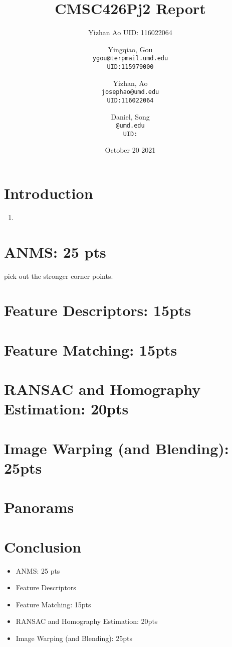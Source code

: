 \documentclass{article}
\title{CMSC426Pj2 Report}
\author{Yizhan Ao UID: 116022064}
\author{
  Yingqiao, Gou\\
  \texttt{ygou@terpmail.umd.edu}\\
  \texttt{UID:115979000}
  \and
  Yizhan, Ao\\
  \texttt{josephao@umd.edu}\\
  \texttt{UID:116022064}
  \and
  Daniel, Song\\
  \texttt{@umd.edu}\\
  \texttt{UID:}
}
\date{October 20 2021}
\begin{document}
\maketitle

\section{Introduction}
\begin{enumerate}
   \item
\end{enumerate}

\section{ANMS: 25 pts}
 pick out the stronger corner points.\\
 
\section{Feature Descriptors: 15pts}

\section{Feature Matching: 15pts}

\section{RANSAC and Homography Estimation: 20pts}
 
 
 
\section{Image Warping (and Blending): 25pts}

\section{Panorams}


\section{Conclusion}




\begin{itemize}

    \item ANMS: 25 pts
    \item Feature Descriptors
    \item Feature Matching: 15pts
    \item RANSAC and Homography Estimation: 20pts
    \item Image Warping (and Blending): 25pts

\end{itemize}
\end{document}
